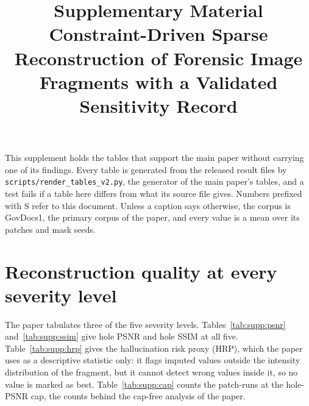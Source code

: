 \documentclass[11pt]{article}
\title{Supplementary Material\\
Constraint-Driven Sparse Reconstruction of Forensic Image Fragments with a Validated Sensitivity Record}
\date{}
\begin{document}
\maketitle

This supplement holds the tables that support the main paper without carrying
one of its findings. Every table is generated from the released result files by
\texttt{scripts/render\_tables\_v2.py}, the generator of the main paper's tables,
and a test fails if a table here differs from what its source file gives.
Numbers prefixed with S refer to this document. Unless a caption says
otherwise, the corpus is GovDocs1, the primary corpus of the paper, and every
value is a mean over its patches and mask seeds.

\section{Reconstruction quality at every severity level}
\label{sec:supp:quality}

The paper tabulates three of the five severity levels. Tables~\ref{tab:supp:psnr}
and~\ref{tab:supp:ssim} give hole PSNR and hole SSIM at all five.
Table~\ref{tab:supp:hrp} gives the hallucination risk proxy (HRP), which the paper
uses as a descriptive statistic only: it flags imputed values outside the
intensity distribution of the fragment, but it cannot detect wrong values inside
it, so no value is marked as best. Table~\ref{tab:supp:cap} counts the
patch-runs at the hole-PSNR cap, the counts behind the cap-free analysis of the
paper.
\end{document}
